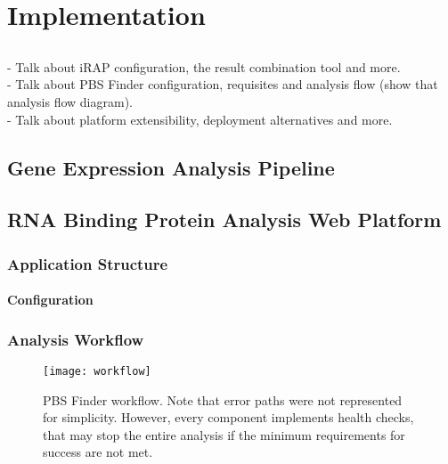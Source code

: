 \chapter{Implementation} \label{chap:implementation}

\section*{}

\begin{Notes}
- Talk about iRAP configuration, the result combination tool and more.\\
- Talk about PBS Finder configuration, requisites and analysis flow (show that analysis flow diagram).\\
- Talk about platform extensibility, deployment alternatives and more.\\
\end{Notes}

\section{Gene Expression Analysis Pipeline}

\section{RNA Binding Protein Analysis Web Platform}

\subsection{Application Structure}

\subsubsection*{Configuration}

\subsection{Analysis Workflow}

\begin{figure}[!htb]
  \begin{center}
    \leavevmode
    \texttt{[image: workflow]}
    \caption[PBS Finder workflow]{
      PBS Finder workflow. Note that error paths were not represented for
      simplicity. However, every component implements health checks, that may
      stop the entire analysis if the minimum requirements for success are not
      met.
    }
    \label{fig:workflow}
  \end{center}
\end{figure}

